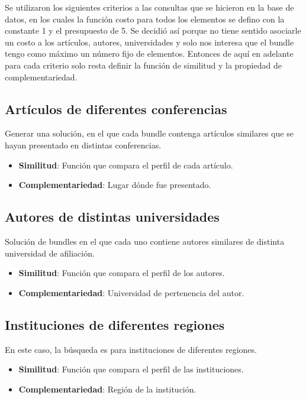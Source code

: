 Se utilizaron los siguientes criterios a las consultas que se hicieron en la base de datos, en los cuales la función costo para todos los elementos se defino con la constante 1 y el presupuesto de 5. Se decidió así porque no tiene sentido asociarle un costo a los artículos, autores, universidades y solo nos interesa que el bundle tengo como máximo un número fijo de elementos. Entonces de aquí en adelante para cada criterio solo resta definir la función de similitud y la propiedad de complementariedad.

\subsection{Artículos de diferentes conferencias}\label{bus:papSimDisLug}
Generar una solución, en el que cada bundle contenga artículos similares que se hayan presentado en distintas conferencias.\\
\begin{itemize}
  \item \textbf{Similitud}: Función que compara el perfil de cada artículo.
  \item \textbf{Complementariedad}: Lugar dónde fue presentado.
\end{itemize}

\subsection{Autores de distintas universidades}
Solución de bundles en el que cada uno contiene autores similares de distinta universidad de afiliación.\\
\begin{itemize}
  \item \textbf{Similitud}: Función que compara el perfil de los autores.
  \item \textbf{Complementariedad}: Universidad de pertenencia del autor.
\end{itemize}

\subsection{Instituciones de diferentes regiones}
En este caso, la búsqueda es para instituciones de diferentes regiones. 
\begin{itemize}
  \item \textbf{Similitud}: Función que compara el perfil de las instituciones.
  \item \textbf{Complementariedad}: Región de la institución.
\end{itemize}

